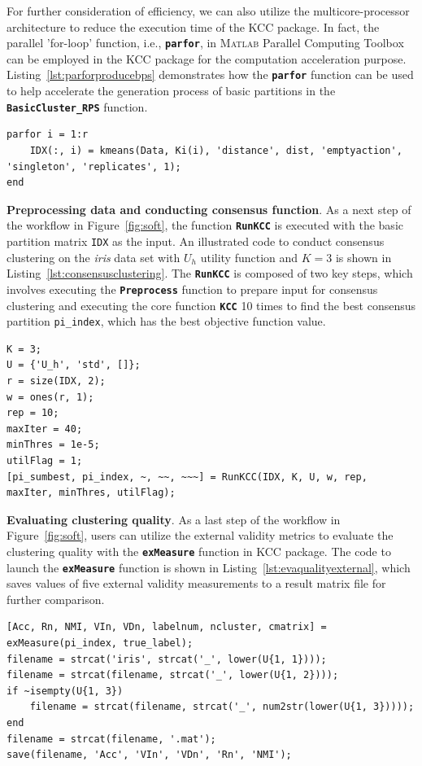 \documentclass[10pt]{acmtrans2e}
\newcommand{\Matlab}{\textsc{Matlab}}
\newcommand{\package}[1]{\textsf{#1}\xspace} %
\newcommand{\function}[1]{\textbf{\texttt{#1}}}
\newcommand{\parameter}[1]{\texttt{#1}}
\begin{document}
For further consideration of efficiency, we can also utilize the multicore-processor architecture to reduce the execution time of the \package{KCC} package. In fact, the parallel 'for-loop' function, i.e., \function{parfor}, in \Matlab{} \package{Parallel Computing Toolbox} can be employed in the \package{KCC} package for the computation acceleration purpose. Listing~\ref{lst:parforproducebps} demonstrates how the \function{parfor} function can be used to help accelerate the generation process of basic partitions in the \function{BasicCluster\_RPS} function.
\begin{lstlisting}[caption={Using \function{parfor} to accelerate the process of generating BPs.},label=lst:parforproducebps]
parfor i = 1:r
    IDX(:, i) = kmeans(Data, Ki(i), 'distance', dist, 'emptyaction', 'singleton', 'replicates', 1);
end
\end{lstlisting}

\textbf{Preprocessing data and conducting consensus function}. As a next step of the workflow in Figure~\ref{fig:soft}, the function \function{RunKCC} is executed with the basic partition matrix \parameter{IDX} as the input. An illustrated code to conduct consensus clustering on the \textit{iris} data set with $U_h$ utility function and $K=3$ is shown in Listing~\ref{lst:consensusclustering}. The \function{RunKCC} is composed of two key steps, which involves executing the \function{Preprocess} function to prepare input for consensus clustering and executing the core function \function{KCC} 10 times to find the best consensus partition \parameter{pi\_index}, which has the best objective function value.
\begin{lstlisting}[caption={Using \function{RunKCC} to conduct consensus clustering.},label=lst:consensusclustering]
K = 3;
U = {'U_h', 'std', []};
r = size(IDX, 2);
w = ones(r, 1);
rep = 10;
maxIter = 40;
minThres = 1e-5;
utilFlag = 1;
[pi_sumbest, pi_index, ~, ~~, ~~~] = RunKCC(IDX, K, U, w, rep, maxIter, minThres, utilFlag);
\end{lstlisting}

\textbf{Evaluating clustering quality}. As a last step of the workflow in Figure~\ref{fig:soft}, users can utilize the external validity metrics to evaluate the clustering quality with the \function{exMeasure} function in \package{KCC} package. The code to launch the \function{exMeasure} function is shown in Listing~\ref{lst:evaqualityexternal}, which saves values of five external validity measurements to a result matrix file for further comparison.
\begin{lstlisting}[caption={Using \function{exMeasure} to evaluate the clustering quality.},label=lst:evaqualityexternal]
[Acc, Rn, NMI, VIn, VDn, labelnum, ncluster, cmatrix] = exMeasure(pi_index, true_label);
filename = strcat('iris', strcat('_', lower(U{1, 1})));
filename = strcat(filename, strcat('_', lower(U{1, 2})));
if ~isempty(U{1, 3})
    filename = strcat(filename, strcat('_', num2str(lower(U{1, 3}))));
end
filename = strcat(filename, '.mat');
save(filename, 'Acc', 'VIn', 'VDn', 'Rn', 'NMI');
\end{lstlisting}
\end{document}
